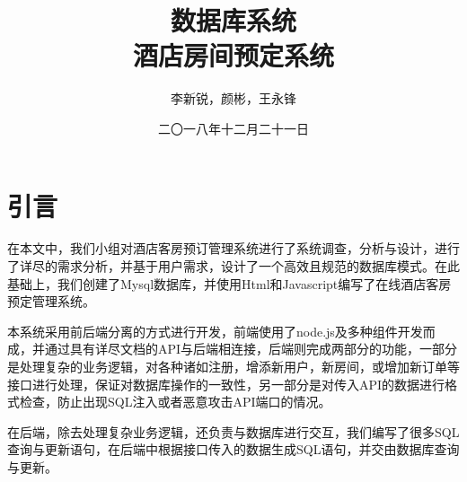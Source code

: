 \documentclass{myreport}
\begin{document}
\title{数据库系统 \\ 酒店房间预定系统}
\author{李新锐，颜彬，王永锋}                            %
\date{二〇一八年十二月二十一日}                %
\maketitle
\frontmatter
\tableofcontents
\mainmatter 


\chapter{引言}

在本文中，我们小组对酒店客房预订管理系统进行了系统调查，分析与设计，进行了详尽的需求分析，并基于用户需求，设计了一个高效且规范的数据库模式。在此基础上，我们创建了Mysql数据库，并使用Html和Javascript编写了在线酒店客房预定管理系统。

本系统采用前后端分离的方式进行开发，前端使用了node.js及多种组件开发而成，并通过具有详尽文档的API与后端相连接，后端则完成两部分的功能，一部分是处理复杂的业务逻辑，对各种诸如注册，增添新用户，新房间，或增加新订单等接口进行处理，保证对数据库操作的一致性，另一部分是对传入API的数据进行格式检查，防止出现SQL注入或者恶意攻击API端口的情况。

在后端，除去处理复杂业务逻辑，还负责与数据库进行交互，我们编写了很多SQL查询与更新语句，在后端中根据接口传入的数据生成SQL语句，并交由数据库查询与更新。
\end{document}
